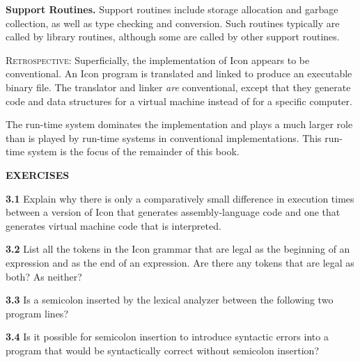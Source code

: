 \textbf{Support Routines. }Support routines include storage allocation
and garbage collection, as well as type checking and conversion. Such
routines typically are called by library routines, although some are
called by other support routines.

\textsc{Retrospective}: Superficially, the implementation of Icon
appears to be conventional. An Icon program is translated and linked
to produce an executable binary file. The translator and linker
\textit{are }conventional, except that they generate code and data
structures for a virtual machine instead of for a specific computer.

The run-time system dominates the implementation and plays a much
larger role than is played by run-time systems in conventional
implementations. This run-time system is the focus of the remainder of
this book.

{\sffamily\bfseries EXERCISES}

\textbf{3.1} Explain why there is only a comparatively small difference
in execution times between a version of Icon that generates
assembly-language code and one that generates virtual machine code
that is interpreted.

\textbf{3.2} List all the tokens in the Icon grammar that are legal as the
beginning of an expression and as the end of an expression. Are there
any tokens that are legal as both? As neither?

\textbf{3.3} Is a semicolon inserted by the lexical analyzer between the
following two program lines?


\textbf{3.4} Is it possible for semicolon insertion to introduce
syntactic errors into a program that would be syntactically correct
without semicolon insertion?

